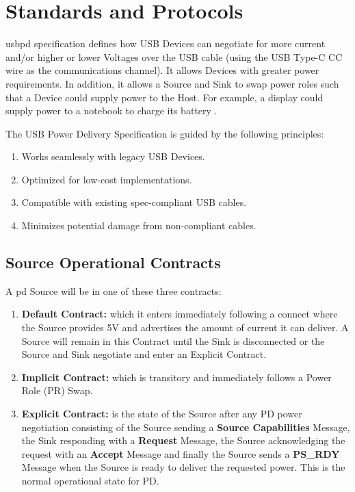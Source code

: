 \section{Standards and Protocols}

\gls{usbpd} specification defines how USB Devices can negotiate for more current and/or higher or lower Voltages over the USB cable (using the USB Type-C CC wire as the communications channel). It allows Devices with greater power requirements. In addition, it allows a Source and Sink to swap power roles such that a Device could supply power to the Host. For example, a display could supply power to a notebook to charge its battery \cite{usb_power_delivery}.

The USB Power Delivery Specification is guided by the following principles:
\begin{enumerate}
    \item Works seamlessly with legacy USB Devices.
    \item Optimized for low-cost implementations.
    \item Compatible with existing spec-compliant USB cables.
    \item Minimizes potential damage from non-compliant cables.
\end{enumerate}

\subsection{Source Operational Contracts}

A \gls{pd} Source will be in one of these three contracts:

\begin{enumerate}
    \item \textbf{Default Contract:} which it enters immediately following a connect where the Source provides 5V and advertises the amount of current it can deliver. A Source will remain in this Contract until the Sink is disconnected or the Source and Sink negotiate and enter an Explicit Contract.
    \item \textbf{Implicit Contract:} which is transitory and immediately follows a Power Role (PR) Swap.
    \item \textbf{Explicit Contract:} is the state of the Source after any PD power negotiation consisting of the Source sending a \textbf{Source Capabilities} Message, the Sink responding with a \textbf{Request} Message, the Source acknowledging the request with an \textbf{Accept} Message and finally the Source sends a \textbf{PS\_RDY} Message when the Source is ready to deliver the requested power. This is the normal operational state for PD.
\end{enumerate}

